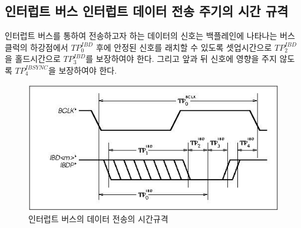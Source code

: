 \subsection{인터럽트 버스 인터럽트 데이터 전송 주기의 시간 규격}
인터럽트 버스를 통하여 전송하고자 하는 데이터의 신호는
백플레인에 나타나는 버스클럭의 하강점에서 $TP^{IBD}_0$ 후에
안정된 신호를 래치할 수 있도록 셋업시간으로 $TP^{IBD}_2$을
홀드시간으로 $TP^{IBD}_3$를 보장하여야 한다.
그리고 앞과 뒤 신호에 영향을 주지 않도록 $TP^{IBSYNC}_4$을
보장하여야 한다.
%

\begin{figure}[htb]
    \centerline{\includegraphics{ch6/FIG/ibd-time.jpg}}
   \caption{인터럽트 버스의 데이터 전송의 시간규격}\label{figure:ibd-time}
\end{figure}
